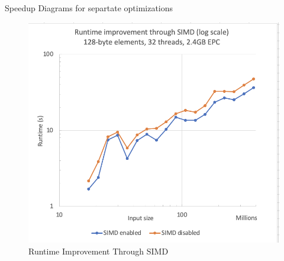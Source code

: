 \documentclass[final,hyperref={pdfpagelabels=false}]{beamer}
\begin{document}
\begin{frame}
\begin{columns}[t]

  \begin{column}{.30\linewidth}

    \begin{block}{Speedup Diagrams for separtate optimizations}
    \end{block}
    \begin{figure}[h]
        \centering
        \begin{minipage}{0.8\linewidth}
            \includegraphics[width=\linewidth]{assets/shuffle.png}
            \caption{Runtime Improvement Through SIMD}
        \end{minipage}
    \end{figure}


\end{column}
\end{columns}
\end{frame}
\end{document}
